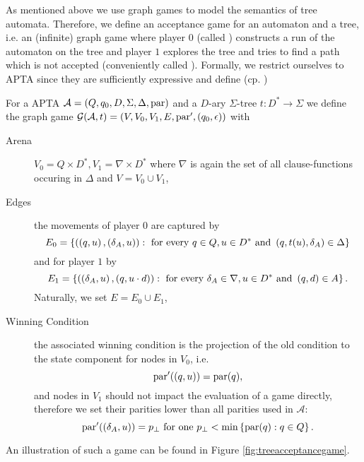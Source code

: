 As mentioned above we use graph games to model the semantics of tree automata.
Therefore, we define an acceptance game for an automaton and a tree, i.e. an 
(infinite) graph game where player $0$ (called \automaton{}) constructs a run 
of the automaton on the tree and player $1$ explores the tree and tries to find 
a path which is not accepted (conveniently called \pathfinder{}). Formally, we 
restrict ourselves to \ac{APTA} since they are sufficiently expressive and 
define (cp. \cite{treeautosurvey,AltTreeAuto})
\begin{definition}
  For a \ac{APTA} $\mathcal{A} = \left(Q, q_{0}, D, \Sigma, \Delta, \operatorname{par}\right)$
  and a $D$-ary $\Sigma$-tree $t:D^{*}\rightarrow\Sigma$ we define the graph 
  game $\mathcal{G}(\mathcal{A}, t) = \left(V, V_{0}, V_{1}, E, 
  \operatorname{par}', \left(q_{0},\epsilon\right)\right)$ with
  \begin{description}
    \item [Arena] 
      $V_{0} = Q\times D^{*},V_{1} = \nabla\times D^{*}$ where $\nabla$ is 
      again the set of all clause-functions occuring in $\Delta$ and 
      $V = V_{0}\cup V_{1}$,
    \item [Edges] 
      the movements of player $0$ are captured by
      \begin{equation*}
        E_{0} = \left\{
          \left(\left(q, u\right),\left(\delta_{A}, u\right)\right):\text{ for every }
          q\in Q,u\in D^{*}\text{ and }\left(q, t(u), \delta_{A}\right)\in\Delta
        \right\}
      \end{equation*}
      and for player $1$ by
      \begin{equation*}
        E_{1} = \left\{
          \left(\left(\delta_{A}, u\right), \left(q, u\cdot d\right)\right):\text{ for every }
          \delta_{A}\in\nabla, u\in D^{*}\text{ and }\left(q,d\right)\in A
        \right\}.
      \end{equation*}
      Naturally, we set $E = E_{0}\cup E_{1}$,
    \item [Winning Condition]
      the associated winning condition is the projection of the old 
      condition to the state component for nodes in $V_{0}$, i.e.
      \begin{equation*}
        \operatorname{par}'(\left(q, u\right)) = \operatorname{par}(q),
      \end{equation*}
      and nodes in $V_{1}$ should not impact the evaluation of a game directly, 
      therefore we set their parities lower than all parities used in 
      $\mathcal{A}$:
      \begin{equation*}
        \operatorname{par}'(\left(\delta_{A}, u\right)) = p_{\bot}
        \text{ for one }p_{\bot} < \min\left\{\operatorname{par}(q):q\in Q\right\}.
      \end{equation*}
  \end{description}
  \label{def:treemembershipgame}
\end{definition}
An illustration of such a game can be found in Figure 
\ref{fig:treeacceptancegame}. 

